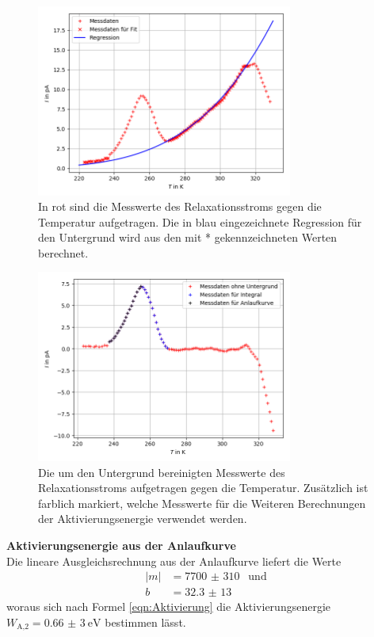 \begin{figure}
  \centering
  \includegraphics[width=0.75\textwidth]{Dipol2mitUntergrund.png}
  \caption{In rot sind die Messwerte des Relaxationsstroms gegen die Temperatur aufgetragen. Die in
  blau eingezeichnete Regression für den Untergrund wird aus den mit * gekennzeichneten
  Werten berechnet.}
  \label{fig:Abb1}
\end{figure}

\begin{figure}[H]
  \centering
  \includegraphics[width=0.75\textwidth]{Dipol2ohneUntergrund.png}
  \caption{Die um den Untergrund bereinigten Messwerte des Relaxationsstroms aufgetragen gegen die
  Temperatur. Zusätzlich ist farblich markiert, welche Messwerte für die Weiteren Berechnungen der Aktivierungsenergie
  verwendet werden.}
  \label{fig:Abb2}
\end{figure}


\textbf{Aktivierungsenergie aus der Anlaufkurve}\\
Die lineare Ausgleichsrechnung aus der Anlaufkurve liefert die Werte
\begin{align*}
  |m|&=\SI{7700(310)}{}\;\; \text{und}\\
  b&=\SI{32,3(13)}{}
\end{align*}
woraus sich nach Formel \ref{eqn:Aktivierung} die Aktivierungsenergie $W_\text{A,2}=\SI{0,66(3)}{\eV}$
bestimmen lässt.

